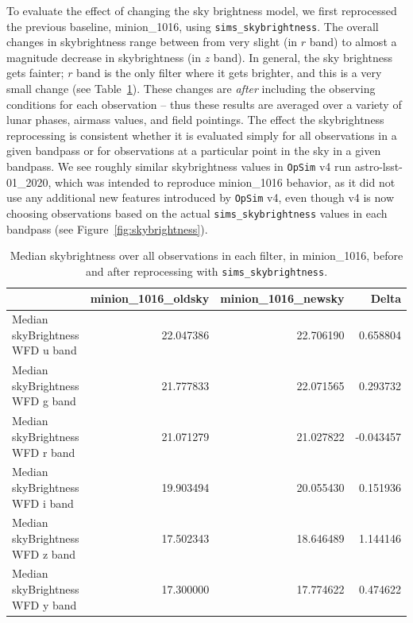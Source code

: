 \documentclass[DM,lsstdraft,authoryear,toc]{lsstdoc}
\newcommand{\opsim}{\texttt{OpSim}\xspace}
\newcommand{\simsky}{\texttt{sims\_skybrightness}\xspace}
\begin{document}

To evaluate the effect of changing the sky brightness model, we first reprocessed the previous baseline, minion\_1016, using \simsky. The overall changes in skybrightness range between from very slight (in $r$ band) to almost a magnitude decrease in skybrightness (in $z$ band). In general, the sky brightness gets fainter; $r$ band is the only filter where it gets brighter, and this is a very small change (see Table~\ref{tab:medskybright}). These changes are {\it after} including the observing conditions for each observation -- thus these results are averaged over a variety of lunar phases, airmass values, and field pointings. The effect the skybrightness reprocessing is consistent whether it is evaluated simply for all observations in a given bandpass or  for observations at a particular point in the sky in a given bandpass. We see roughly similar skybrightness values in \opsim v4 run astro-lsst-01\_2020, which was intended to reproduce minion\_1016 behavior, as it did not use any additional new features introduced by \opsim v4, even though v4 is now choosing observations based on the actual \simsky values in each bandpass (see Figure~\ref{fig:skybrightness}).

\begin{table}[htp]
\caption{Median skybrightness over all observations in each filter, in minion\_1016, before and after reprocessing with \simsky.}
\begin{center}
\begin{tabular}{lrrr}
\toprule
{} &  minion\_1016\_oldsky &  minion\_1016\_newsky &    Delta \\
\midrule
Median skyBrightness WFD u band       &           22.047386 &           22.706190 &  0.658804 \\
Median skyBrightness WFD g band       &           21.777833 &           22.071565 &  0.293732 \\
Median skyBrightness WFD r band       &           21.071279 &           21.027822 & -0.043457 \\
Median skyBrightness WFD i band       &           19.903494 &           20.055430 &  0.151936 \\
Median skyBrightness WFD z band       &           17.502343 &           18.646489 &  1.144146 \\
Median skyBrightness WFD y band       &           17.300000 &           17.774622 &  0.474622 \\
\bottomrule
\end{tabular}
\end{center}
\label{tab:medskybright}
\end{table}
\end{document}
